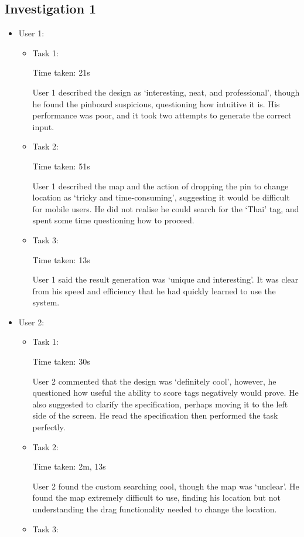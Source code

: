 \documentclass[10pt,a4paper]{article}
\begin{document}
\subsection*{Investigation 1}

\begin{itemize}
\item{User 1:
\begin{itemize}
\item{Task 1: 

Time taken: 21s

User 1 described the design as ‘interesting, neat, and professional’, though he found the pinboard suspicious, questioning how intuitive it is.
His performance was poor, and it took two attempts to generate the correct input.}
\item{Task 2:

Time taken: 51s

User 1 described the map and the action of dropping the pin to change location as ‘tricky and time-consuming’, suggesting it would be difficult for mobile users. 
He did not realise he could search for the ‘Thai’ tag, and spent some time questioning how to proceed.}
\item{Task 3:

Time taken: 13s

User 1 said the result generation was ‘unique and interesting’. It was clear from his speed and efficiency that he had quickly learned to use the system.}
\end{itemize}}

\item{User 2:
\begin{itemize}

\item{Task 1:

Time taken: 30s

User 2 commented that the design was ‘definitely cool’, however, he questioned how useful the ability to score tags negatively would prove. He also suggested to clarify the specification, perhaps moving it to the left side of the screen.
He read the specification then performed the task perfectly.}
\item{Task 2:

Time taken: 2m, 13s

User 2 found the custom searching cool, though the map was ‘unclear’.
He found the map extremely difficult to use, finding his location but not understanding the drag functionality needed to change the location.}
\item{Task 3:

}
\end{itemize}}
\end{itemize}
\end{document}
